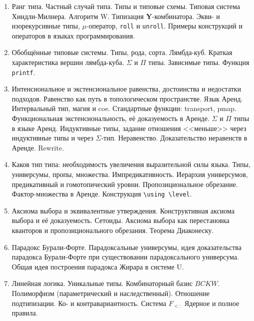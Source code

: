 \documentclass[11pt,a4paper,oneside]{article}
\begin{document}
\begin{enumerate}
\item Ранг типа. Частный случай типа. Типы и типовые схемы. Типовая система Хиндли-Милнера. Алгоритм W.
Типизация \textbf{Y}-комбинатора. Экви- и изорекурсивные типы, $\mu$-оператор, \texttt{roll} и \texttt{unroll}.
Примеры конструкций и операторов в языках программирования.
\item Обобщённые типовые системы. Типы, рода, сорта. Лямбда-куб. Краткая характеристика вершин лямбда-куба. 
$\Sigma$ и $\Pi$ типы. Зависимые типы. Функция \verb!printf!.
\item Интенсиональное и экстенсиональное равенства, достоинства и недостатки подходов.
Равенство как путь в топологическом пространстве. Язык Аренд. Интервальный тип, магия и coe. 
Стандартные функции: transport, pmap. 
Функциональная экстенсиональность, её доказуемость в Аренде. $\Sigma$ и $\Pi$ типы в языке Аренд. 
Индуктивные типы, задание отношения <<меньше>> через индуктивные типы и через $\Sigma$-тип. 
Неравенство. Доказательство неравенств в Аренде. Rewrite. 
\item Каков тип типа: необходимость увеличения выразительной силы языка.
Типы, универсумы, пропы, множества. Импредикативность. Иерархия универсумов, предикативный и гомотопический 
уровни. Пропозициональное обрезание. Фактор-множества в Аренде. Конструкция \verb!\using \level!. 
\item Аксиома выбора и эквивалентные утверждения. 
Конструктивная аксиома выбора и её доказуемость. Сетоиды. Аксиома выбора как перестановка кванторов и пропозиционального
обрезания. Теорема Диаконеску. 
\item  
Парадокс Бурали-Форте. Парадоксальные универсумы, идея доказательства парадокса Бурали-Форте при 
существовании парадоксального универсума. Общая идея построения парадокса Жирара в системе U.
\item Линейная логика. Уникальные типы. Комбинаторный базис $BCKW$.
Полиморфизм (параметрический и наследственный). Отношение подтипизации. Ко- и контравариантность. 
Система $F_{<:}$ Ядерное и полное правила.
\end{enumerate}
\end{document}
